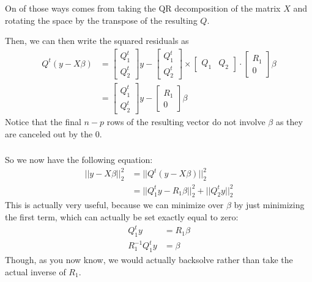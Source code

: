 \begin{frame}[fragile] \frametitle{}

On of those ways comes from taking the QR decomposition of the
matrix $X$ and rotating the space by the transpose of
the resulting $Q$.

\pause Then, we can then write the squared residuals as
\begin{align*}
Q^t (y - X \beta)&=
\left[ \begin{array}{c} Q_1^t \\ Q_2^t \end{array} \right] y -
\left[ \begin{array}{c} Q_1^t \\ Q_2^t \end{array} \right] \times
\left[ \begin{array}{cc} Q_1 & Q_2 \end{array} \right] \cdot
\left[ \begin{array}{c} R_1 \\ 0 \end{array} \right] \beta \\
&= \left[ \begin{array}{c} Q_1^t \\ Q_2^t \end{array} \right] y -
\left[ \begin{array}{c} R_1 \\ 0 \end{array} \right] \beta
\end{align*}
Notice that the final $n-p$ rows of the resulting vector do not
involve $\beta$ as they are canceled out by the $0$.

\end{frame}

\begin{frame}[fragile] \frametitle{}

So we now have the following equation:
\begin{align*}
||y - X \beta ||_2^2 &=||Q^t (y - X \beta) ||_2^2 \\
&= ||Q_1^t y - R_1 \beta||_2^2 +
||Q_2^t y ||_2^2
\end{align*}
\pause This is actually very useful, because we can
minimize over $\beta$ by just minimizing the first
term, which can actually be set exactly equal to zero:
\begin{align*}
Q_1^t y &= R_1 \beta \\
R_1^{-1} Q_1^t y &= \beta
\end{align*}
Though, as you now know, we would actually backsolve
rather than take the actual inverse of $R_1$.

\end{frame}

